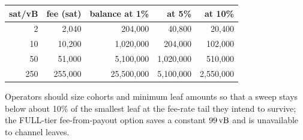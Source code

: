 \begin{center}\scriptsize
\begin{tabular}{@{}rrrrr@{}}
\toprule
sat/vB & fee (sat) & balance at 1\% & at 5\% & at 10\% \\
\midrule
2 & 2{,}040 & 204{,}000 & 40{,}800 & 20{,}400 \\
10 & 10{,}200 & 1{,}020{,}000 & 204{,}000 & 102{,}000 \\
50 & 51{,}000 & 5{,}100{,}000 & 1{,}020{,}000 & 510{,}000 \\
250 & 255{,}000 & 25{,}500{,}000 & 5{,}100{,}000 & 2{,}550{,}000 \\
\bottomrule
\end{tabular}
\end{center}

Operators should size cohorts and minimum leaf amounts so that a sweep
stays below about 10\% of the smallest leaf at the fee-rate tail they
intend to survive; the FULL-tier fee-from-payout option saves a constant
$99\,\mathrm{vB}$ and is unavailable to channel leaves.
